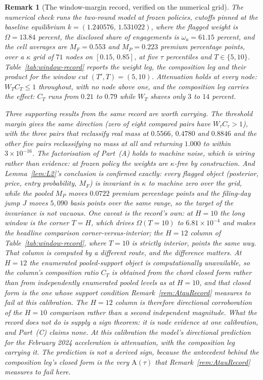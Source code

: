 \documentclass[11pt]{article}
\newtheorem{remark}{Remark}
\newcommand{\Atau}{\mathrm{A}(\tau)}
\begin{document}
\begin{remark}[The window-margin record, verified on the numerical grid]
\label{rem:T1record}
The numerical check runs the two-round model at frozen policies, cutoffs pinned at the baseline
equilibrium $k = (1.240576,\,1.531022)$, where the flagged weight is $\Omega = 13.84$ percent, the
disclosed share of engagements is $\omega_a = 61.15$ percent, and the cell averages are
$M_F = 0.553$ and $M_P = 0.223$ premium percentage points, over a $\kappa$ grid of $71$ nodes on
$[0.15,\,0.85]$, at five $\tau$ percentiles and $T \in \{5,10\}$. Table~\ref{tab:window-record}
reports the weight leg, the composition leg and their product for the window cut
$(T',T) = (5,10)$. Attenuation holds at every node: $W_T C_T \le 1$ throughout, with no node above
one, and the composition leg carries the effect: $C_T$ runs from $0.21$ to $0.79$ while $W_T$ shaves
only $3$ to $14$ percent.


Three supporting results from the same record are worth carrying. The threshold margin gives the
same direction (zero of eight compared pairs have $W_\tau C_\tau > 1$), with the three pairs
that reclassify real mass at $0.5566$, $0.4780$ and $0.8846$ and the other five pairs reclassifying
no mass at all and returning $1.000$ to within $3\times 10^{-16}$. The factorisation of Part~(A) holds to machine noise,
which is wiring rather than evidence: at frozen policy the weights are $\kappa$-free by
construction. And Lemma~\ref{lem:L2}'s conclusion is confirmed \emph{exactly}: every flagged object
(posterior, price, entry probability, $M_F$) is invariant in $\kappa$ to machine zero over the
grid, while the pooled $M_P$ moves $0.0722$ premium percentage points and the filing-day jump $J$
moves $5{,}090$ basis points over the same range, so the target of the invariance is not vacuous.
One caveat is the record's own: at $H = 10$ the long window is the corner $T = H$, which drives
$\Omega(T{=}10)$ to $6.81\times10^{-4}$ and makes the headline comparison corner-versus-interior;
the $H = 12$ column of Table~\ref{tab:window-record}, where $T = 10$ is strictly interior, points
the same way. That column is computed by a different route, and the difference matters. At $H = 12$
the enumerated pooled-support object is computationally unavailable, so the column's composition
ratio $C_T$ is obtained from the chord closed form rather than from independently enumerated pooled
levels as at $H = 10$, and that closed form is the one whose support condition
Remark~\ref{rem:AtauRecord} measures to fail at this calibration. The $H = 12$ column is therefore
directional corroboration of the $H = 10$ comparison rather than a second independent magnitude.
What the record does not do is supply a sign theorem: it is node evidence at one
calibration, and Part~(C) claims none. At this calibration the model's directional prediction for
the February 2024 acceleration is attenuation, with the composition leg carrying it. The
prediction is not a derived sign, because the antecedent behind the composition leg's closed form
is the very $\Atau$ that Remark~\ref{rem:AtauRecord} measures to fail here.
\end{remark}
\end{document}
